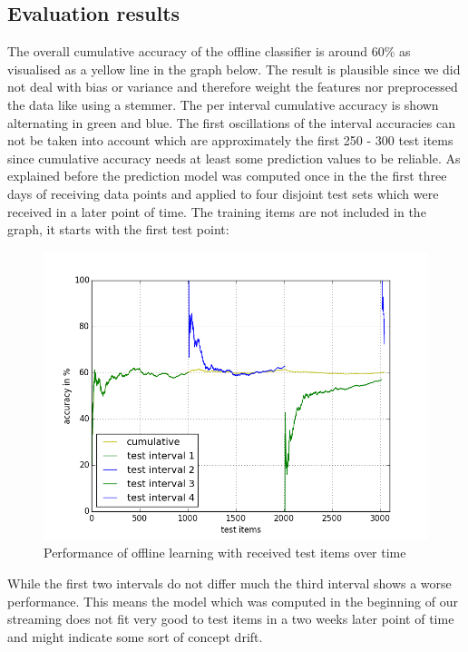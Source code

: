 \documentclass{article} %
\begin{document}
\subsection{Evaluation results}

The overall cumulative accuracy of the offline classifier is around 60\% as visualised as a yellow line in the graph below. The result is plausible since we did not deal with bias or variance and therefore weight the features nor preprocessed the data like using a stemmer. The per interval cumulative accuracy is shown alternating in green and blue. The first oscillations of the interval accuracies can not be taken into account which are approximately the first 250 - 300 test items since cumulative accuracy needs at least some prediction values to be reliable. As explained before the prediction model was computed once in the the first three days of receiving data points and applied to four disjoint test sets which were received in a later point of time. The training items are not included in the graph, it starts with the first test point:
\begin{figure}[htbp]
  \centering
  \includegraphics[scale=0.5]{./plots/batchPlot.png}
  \caption{Performance of offline learning with received test items over time}
\end{figure}

While the first two intervals do not differ much the third interval shows a worse performance. This means the model which was computed in the beginning of our streaming does not fit very good to test items in a two weeks later point of time and  might indicate some sort of concept drift.
\end{document}
